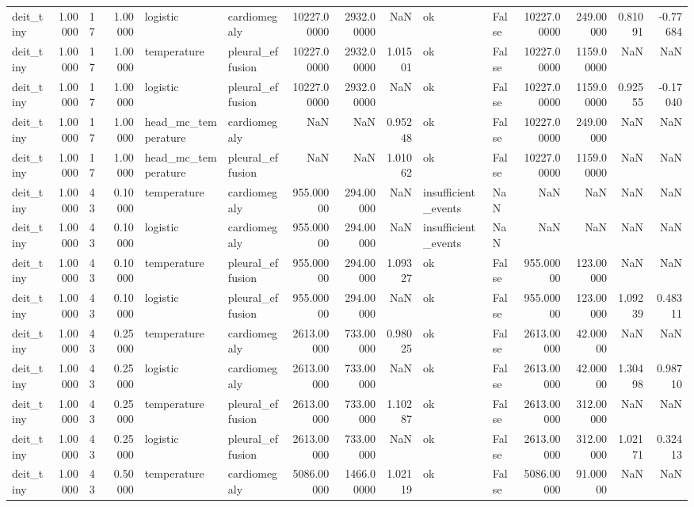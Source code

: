 \begin{tabular}{lrlrllrrrllrrrr}
deit\_tiny & 1.00000 & 17 & 1.00000 & logistic & cardiomegaly & 10227.00000 & 2932.00000 & NaN & ok & False & 10227.00000 & 249.00000 & 0.81091 & -0.77684 \\
deit\_tiny & 1.00000 & 17 & 1.00000 & temperature & pleural\_effusion & 10227.00000 & 2932.00000 & 1.01501 & ok & False & 10227.00000 & 1159.00000 & NaN & NaN \\
deit\_tiny & 1.00000 & 17 & 1.00000 & logistic & pleural\_effusion & 10227.00000 & 2932.00000 & NaN & ok & False & 10227.00000 & 1159.00000 & 0.92555 & -0.17040 \\
deit\_tiny & 1.00000 & 17 & 1.00000 & head\_mc\_temperature & cardiomegaly & NaN & NaN & 0.95248 & ok & False & 10227.00000 & 249.00000 & NaN & NaN \\
deit\_tiny & 1.00000 & 17 & 1.00000 & head\_mc\_temperature & pleural\_effusion & NaN & NaN & 1.01062 & ok & False & 10227.00000 & 1159.00000 & NaN & NaN \\
deit\_tiny & 1.00000 & 43 & 0.10000 & temperature & cardiomegaly & 955.00000 & 294.00000 & NaN & insufficient\_events & NaN & NaN & NaN & NaN & NaN \\
deit\_tiny & 1.00000 & 43 & 0.10000 & logistic & cardiomegaly & 955.00000 & 294.00000 & NaN & insufficient\_events & NaN & NaN & NaN & NaN & NaN \\
deit\_tiny & 1.00000 & 43 & 0.10000 & temperature & pleural\_effusion & 955.00000 & 294.00000 & 1.09327 & ok & False & 955.00000 & 123.00000 & NaN & NaN \\
deit\_tiny & 1.00000 & 43 & 0.10000 & logistic & pleural\_effusion & 955.00000 & 294.00000 & NaN & ok & False & 955.00000 & 123.00000 & 1.09239 & 0.48311 \\
deit\_tiny & 1.00000 & 43 & 0.25000 & temperature & cardiomegaly & 2613.00000 & 733.00000 & 0.98025 & ok & False & 2613.00000 & 42.00000 & NaN & NaN \\
deit\_tiny & 1.00000 & 43 & 0.25000 & logistic & cardiomegaly & 2613.00000 & 733.00000 & NaN & ok & False & 2613.00000 & 42.00000 & 1.30498 & 0.98710 \\
deit\_tiny & 1.00000 & 43 & 0.25000 & temperature & pleural\_effusion & 2613.00000 & 733.00000 & 1.10287 & ok & False & 2613.00000 & 312.00000 & NaN & NaN \\
deit\_tiny & 1.00000 & 43 & 0.25000 & logistic & pleural\_effusion & 2613.00000 & 733.00000 & NaN & ok & False & 2613.00000 & 312.00000 & 1.02171 & 0.32413 \\
deit\_tiny & 1.00000 & 43 & 0.50000 & temperature & cardiomegaly & 5086.00000 & 1466.00000 & 1.02119 & ok & False & 5086.00000 & 91.00000 & NaN & NaN \\

\end{tabular}
